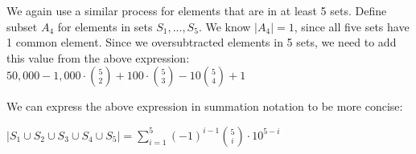 \documentclass[11pt]{article}
\begin{document}
We again use a similar process for elements that are in at least 5 sets. Define subset $A_4$ for elements in sets $S_1, ..., S_5$. We know $|A_4|=1$, since all five sets have 1 common element. Since we oversubtracted elements in 5 sets, we need to add this value from the above expression: $50,000 - 1,000 \cdot \binom{5}{2} + 100 \cdot \binom{5}{3} - 10 \binom{5}{4} + 1$

We can express the above expression in summation notation to be more concise:

$|S_1 \cup S_2 \cup S_3 \cup S_4 \cup S_5| = \sum_{i=1}^{5}(-1)^{i-1} \binom{5}{i} \cdot 10^{5 - i}$
\end{document}

